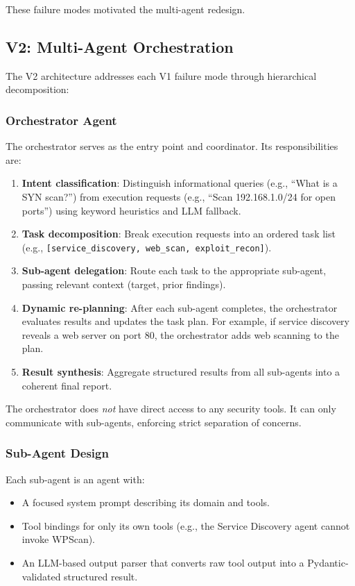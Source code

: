 \documentclass[sigconf,anonymous]{acmart}
\begin{document}
These failure modes motivated the multi-agent redesign.

\subsection{V2: Multi-Agent Orchestration}

The V2 architecture addresses each V1 failure mode through hierarchical decomposition:

\subsubsection{Orchestrator Agent}

The orchestrator serves as the entry point and coordinator. Its responsibilities are:

\begin{enumerate}[leftmargin=*]
    \item \textbf{Intent classification}: Distinguish informational queries (e.g., ``What is a SYN scan?'') from execution requests (e.g., ``Scan 192.168.1.0/24 for open ports'') using keyword heuristics and LLM fallback.
    \item \textbf{Task decomposition}: Break execution requests into an ordered task list (e.g., \texttt{[service\_discovery, web\_scan, exploit\_recon]}).
    \item \textbf{Sub-agent delegation}: Route each task to the appropriate sub-agent, passing relevant context (target, prior findings).
    \item \textbf{Dynamic re-planning}: After each sub-agent completes, the orchestrator evaluates results and updates the task plan. For example, if service discovery reveals a web server on port 80, the orchestrator adds web scanning to the plan.
    \item \textbf{Result synthesis}: Aggregate structured results from all sub-agents into a coherent final report.
\end{enumerate}

The orchestrator does \emph{not} have direct access to any security tools. It can only communicate with sub-agents, enforcing strict separation of concerns.

\subsubsection{Sub-Agent Design}

Each sub-agent is an agent with:

\begin{itemize}[leftmargin=*]
    \item A focused system prompt describing its domain and tools.
    \item Tool bindings for only its own tools (e.g., the Service Discovery agent cannot invoke WPScan).
    \item An LLM-based output parser that converts raw tool output into a Pydantic-validated structured result.
\end{itemize}
\end{document}
